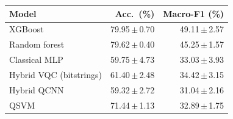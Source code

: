 \begin{tabular}{lrr}
\toprule
Model & Acc.\ (\%) & Macro-F1 (\%) \\
\midrule
XGBoost & 79.95\,$\pm$\,0.70 & 49.11\,$\pm$\,2.57 \\
Random forest & 79.62\,$\pm$\,0.40 & 45.25\,$\pm$\,1.57 \\
Classical MLP & 59.75\,$\pm$\,4.73 & 33.03\,$\pm$\,3.93 \\
Hybrid VQC (bitstrings) & 61.40\,$\pm$\,2.48 & 34.42\,$\pm$\,3.15 \\
Hybrid QCNN & 59.32\,$\pm$\,2.72 & 31.04\,$\pm$\,2.16 \\
QSVM & 71.44\,$\pm$\,1.13 & 32.89\,$\pm$\,1.75 \\
\bottomrule
\end{tabular}
